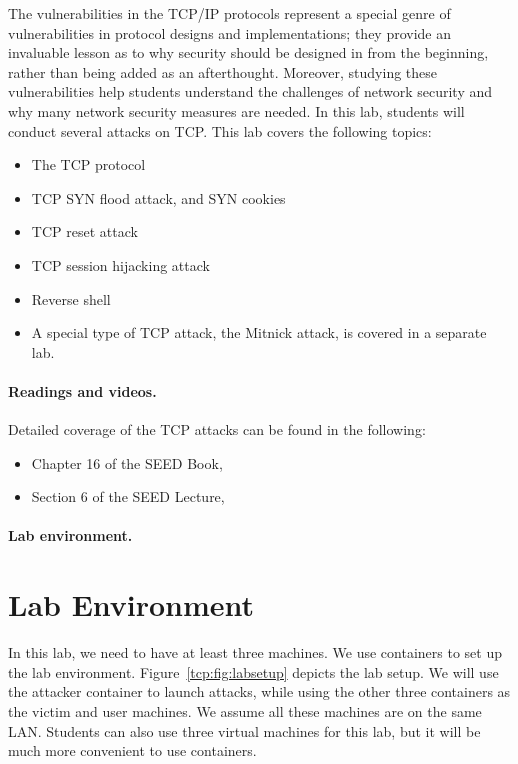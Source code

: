 The vulnerabilities in the TCP/IP protocols represent a special genre of
vulnerabilities in protocol designs and implementations; they provide an
invaluable lesson as to why security should be designed in from the
beginning, rather than being added as an afterthought. Moreover, studying
these vulnerabilities help students understand the challenges of network
security and why many network security measures are needed.
In this lab, students will conduct several attacks on TCP.
This lab covers the following topics:

\begin{itemize}[noitemsep]
\item The TCP protocol
\item TCP SYN flood attack, and SYN cookies 
\item TCP reset attack
\item TCP session hijacking attack
\item Reverse shell 
\item A special type of TCP attack, the Mitnick attack, is covered 
in a separate lab. 
\end{itemize}


\paragraph{Readings and videos.}
Detailed coverage of the TCP attacks can be found in the following:

\begin{itemize}
\item Chapter 16 of the SEED Book, \seedbook
\item Section 6 of the SEED Lecture, \seedisvideo
\end{itemize}


\paragraph{Lab environment.} \seedenvironmentC



\section{Lab Environment}


In this lab, we need to have at least three machines. We use 
containers to set up the lab environment. Figure~\ref{tcp:fig:labsetup}
depicts the lab setup. 
We will use the attacker container to launch attacks, while using the other 
three containers as the victim and user machines. 
We assume all these machines are on the same LAN. 
Students can also use three virtual machines for this lab, 
but it will be much more convenient to use containers. 


